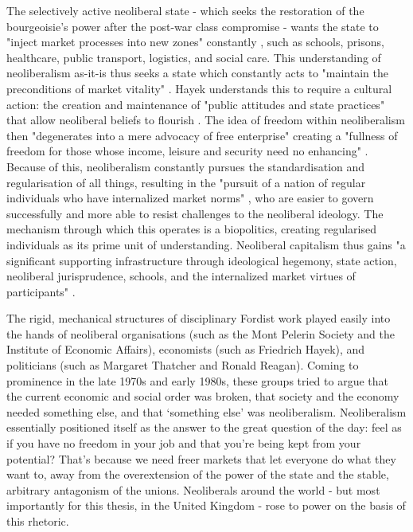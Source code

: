 The selectively active neoliberal state - which seeks the restoration of the bourgeoisie's power after the post-war class compromise - wants the state to "inject market processes into new zones" constantly \citep[p. 21]{connolly_fragility_2013}, such as schools, prisons, healthcare, public transport, logistics, and social care. This understanding of neoliberalism as-it-is thus seeks a state which constantly acts to "maintain the preconditions of market vitality" \citep[p. 60]{connolly_fragility_2013}. Hayek understands this to require a cultural action: the creation and maintenance of "public attitudes and state practices" that allow neoliberal beliefs to flourish \citep[p. 57]{connolly_fragility_2013}. The idea of freedom within neoliberalism then "degenerates into a mere advocacy of free enterprise" creating a "fullness of freedom for those whose income, leisure and security need no enhancing" \citep[p. 265]{polanyi_great_1944}. Because of this, neoliberalism constantly pursues the standardisation and regularisation of all things, resulting in the "pursuit of a nation of regular individuals who have internalized market norms" \citep[p. 53]{connolly_fragility_2013}, who are easier to govern successfully and more able to resist challenges to the neoliberal ideology. The mechanism through which this operates is a biopolitics, creating regularised individuals as its prime unit of understanding. Neoliberal capitalism thus gains "a significant supporting infrastructure through ideological hegemony, state action, neoliberal jurisprudence, schools, and the internalized market virtues of participants" \citep[p. 62]{connolly_fragility_2013}.

The rigid, mechanical structures of disciplinary Fordist work played easily into the hands of neoliberal organisations (such as the Mont Pelerin Society and the Institute of Economic Affairs), economists (such as Friedrich Hayek), and politicians (such as Margaret Thatcher and Ronald Reagan). Coming to prominence in the late 1970s and early 1980s, these groups tried to argue that the current economic and social order was broken, that society and the economy needed something else, and that `something else' was neoliberalism. Neoliberalism essentially positioned itself as the answer to the great question of the day: feel as if you have no freedom in your job and that you're being kept from your potential? That's because we need freer markets that let everyone do what they want to, away from the overextension of the power of the state and the stable, arbitrary antagonism of the unions. Neoliberals around the world - but most importantly for this thesis, in the United Kingdom - rose to power on the basis of this rhetoric.

